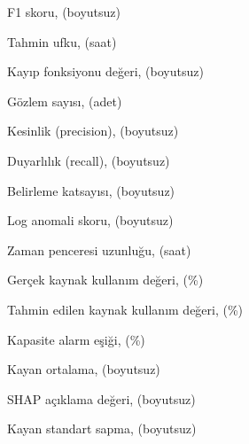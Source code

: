 %
\begin{simge}
	\item [$F_1$]          F1 skoru, (boyutsuz)
	\item [$h$]            Tahmin ufku, (saat)
	\item [$L$]            Kayıp fonksiyonu değeri, (boyutsuz)
	\item [$n$]            Gözlem sayısı, (adet)
	\item [$P$]            Kesinlik (precision), (boyutsuz)
	\item [$R$]            Duyarlılık (recall), (boyutsuz)
	\item [$R^2$]          Belirleme katsayısı, (boyutsuz)
	\item [$s$]            Log anomali skoru, (boyutsuz)
	\item [$T$]            Zaman penceresi uzunluğu, (saat)
	\item [$y$]            Gerçek kaynak kullanım değeri, (\%)
	\item [$\hat{y}$]      Tahmin edilen kaynak kullanım değeri, (\%)
	\item [$\theta$]       Kapasite alarm eşiği, (\%)
	\item [$\mu$]          Kayan ortalama, (boyutsuz)
	\item [$\phi$]         SHAP açıklama değeri, (boyutsuz)
	\item [$\sigma$]       Kayan standart sapma, (boyutsuz)
\end{simge}
